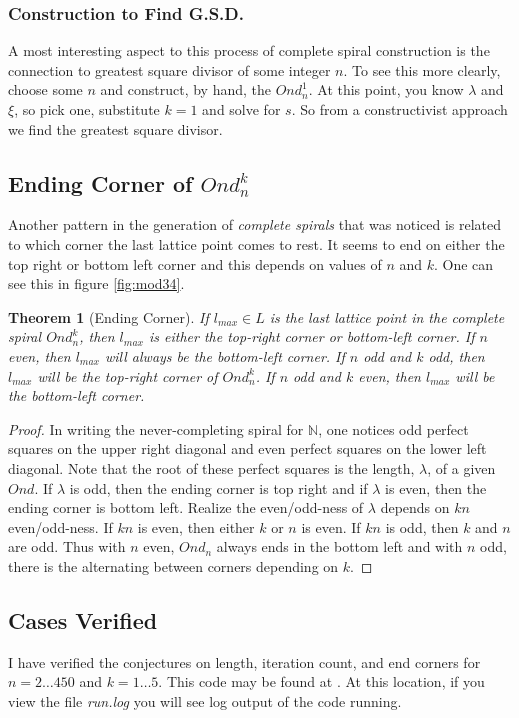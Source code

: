 \documentclass[11pt]{amsart}
\theoremstyle{mydef}
\newtheorem{thm}{Theorem}[section]
\begin{document}
\subsubsection{Construction to Find G.S.D.}
A most interesting aspect to this process of complete spiral construction is the connection to greatest square divisor of some integer $n$. To see this more clearly, choose some $n$ and construct, by hand, the $Ond^1_n$. At this point, you know $\lambda$ and $\xi$, so pick one, substitute $k = 1$ and solve for $s$. So from a constructivist approach we find the greatest square divisor.

\subsection{Ending Corner of $Ond^k_n$}

Another pattern in the generation of \textit{complete spirals} that was noticed is related to which corner the last lattice point comes to rest. It seems to end on either the top right or bottom left corner and this depends on values of $n$ and $k$. One can see this in figure \ref{fig:mod34}. 

\begin{thm}[Ending Corner]
If $l_{max} \in L$ is the last lattice point in the complete spiral $Ond^k_n$, then $l_{max}$ is either the top-right corner or bottom-left corner. If $n$ even, then $l_{max}$ will always be the bottom-left corner. If $n$ odd and $k$ odd, then $l_{max}$ will be the top-right corner of $Ond^k_n$. If $n$ odd and $k$ even, then $l_{max}$ will be the bottom-left corner.
\end{thm}

\begin{proof}
In writing the never-completing spiral for $\mathbb{N}$, one notices odd perfect squares on the upper right diagonal and even perfect squares on the lower left diagonal. Note that the root of these perfect squares is the length, $\lambda$, of a given $Ond$. If $\lambda$ is odd, then the ending corner is top right and if $\lambda$ is even, then the ending corner is bottom left. Realize the even/odd-ness of $\lambda$ depends on $kn$ even/odd-ness. If $kn$ is even, then either $k$ or $n$ is even. If $kn$ is odd, then $k$ and $n$ are odd. Thus with $n$ even, $Ond_n$ always ends in the bottom left and with $n$ odd, there is the alternating between corners depending on $k$.
\end{proof}

\subsection{Cases Verified}
I have verified the conjectures on length, iteration count, and end corners for $n=2\ldots450$ and $k=1\ldots5$. This code may be found at \cite{PySquare}. At this location, if you view the file \textit{run.log} you will see log output of the code running.
\end{document}
